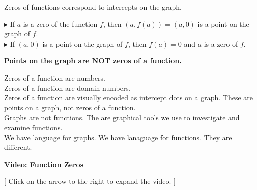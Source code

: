 \documentclass{ximera}
\begin{document}
Zeros of functions correspond to intercepts on the graph.



$\blacktriangleright$ If $a$ is a zero of the function $f$, then $(a, f(a)) = (a, 0)$ is a point on the graph of $f$. \\


$\blacktriangleright$ If $(a, 0)$ is a point on the graph of $f$, then $f(a) = 0$ and $a$ is a zero of $f$.





\begin{warning}

\begin{center}

\textbf{\textcolor{red!70!black}{Points on the graph are NOT zeros of a function.}}

\end{center}


Zeros of a function are numbers. \\

Zeros of a function are domain numbers. \\

Zeros of a function are visually encoded as intercept dots on a graph.  These are points on a graph, not zeros of a function. \\


Graphs are not functions.  The are graphical tools we use to investigate and examine functions. \\


We have language for graphs.  We have lanaguage for functions.  They are different.


\end{warning}





\begin{explanation} \textbf{Video: Function Zeros}

[ Click on the arrow to the right to expand the video. ]
\begin{expandable} 

\begin{center}
\end{center}

\end{expandable}
\end{explanation}
\end{document}
